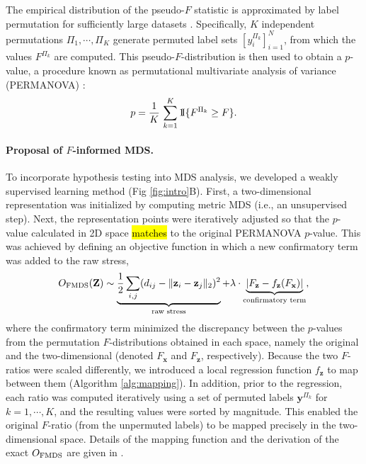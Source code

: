 \documentclass[10pt,letterpaper]{article}
\newcommand{\1}{{\rm 1}\kern-0.24em{\rm I}}
\begin{document}
The empirical distribution of the pseudo-$F$ statistic is approximated by label permutation for sufficiently large datasets \cite{holmes96, gijbels13}.
Specifically, $K$ independent permutations $\Pi_1 , \cdots ,\Pi_K$ generate permuted label sets $[y_i^{\Pi_k}]_{i=1}^{N}$, from which the values $F^{\Pi_k}$ are computed. This pseudo-$F$-distribution is then used to obtain a $p$-value, a procedure known as permutational multivariate analysis of variance (PERMANOVA) \cite{anderson01}:
\begin{equation}
p = \frac{1}{K}\,\sum_{k=1}^{K}\1\{F^{\Pi_k}\geq F\}.
\end{equation}

\paragraph*{Proposal of $F$-informed MDS.}
To incorporate hypothesis testing into MDS analysis, we developed a weakly supervised learning method (Fig \ref{fig:intro}B).
First, a two-dimensional representation was initialized by computing metric MDS (i.e., an unsupervised step).
Next, the representation points were iteratively adjusted so that the $p$-value calculated in 2D space \hl{matches} to the original PERMANOVA $p$-value.
This was achieved by defining an objective function in which a new confirmatory term was added to the raw stress,
\begin{equation} \label{eq:fmds}
    O_{\rm FMDS}(\mathbf{Z}) \sim
    \underbrace{\frac{1}{2}\sum_{i,j} (d_{ij} - \| \mathbf{z}_i - \mathbf{z}_j \|_2 )^2}_\text{raw stress} +
    \lambda\cdot \underbrace{\left|F_\mathbf{z} - f_\mathbf{z}(F_\mathbf{x})\right|}_\text{confirmatory term},
\end{equation}
where the confirmatory term minimized the discrepancy between the $p$-values from the permutation $F$-distributions obtained in each space, namely the original and the two-dimensional (denoted $F_\mathbf{x}$ and $F_\mathbf{z}$, respectively).
Because the two $F$-ratios were scaled differently, we introduced a local regression function $f_\mathbf{z}$ to map between them (Algorithm \ref{alg:mapping}). In addition, prior to the regression, each ratio was computed iteratively using a set of permuted labels $\mathbf{y}^{\Pi_k}$ for $k=1, \cdots, K$, and the resulting values were sorted by magnitude. This enabled the original $F$-ratio (from the unpermuted labels) to be mapped precisely in the two-dimensional space.
Details of the mapping function and the derivation of the exact $O_{\rm FMDS}$ are given in .
\end{document}
